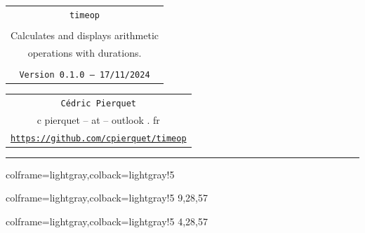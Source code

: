 \documentclass[11pt,a4paper]{ltxdoc}
\def\TPversion{0.1.0}
\def\TPdate{17/11/2024}
\begin{document}
\thispagestyle{empty}

\begin{center}
	\begin{minipage}{0.88\linewidth}
		\begin{tcolorbox}[colframe=yellow,colback=yellow!15]
			\begin{center}
				\renewcommand{\arraystretch}{1.25}%
				\begin{tabular}{c}
					{\Huge \texttt{timeop}}\\
					\\
					{\LARGE Calculates and displays arithmetic} \\
					{\LARGE operations with durations.} \\
					\\
					{\small \texttt{Version \TPversion{} -- \TPdate}}
				\end{tabular}
			\end{center}
		\end{tcolorbox}
	\end{minipage}
\end{center}

\begin{center}
	\begin{tabular}{c}
		\texttt{Cédric Pierquet}\\
		{\ttfamily c pierquet -- at -- outlook . fr}\\
		\texttt{\url{https://github.com/cpierquet/timeop}} \\
	\end{tabular}
\end{center}

\hrule

\vfill

\begin{tcblisting}{colframe=lightgray,colback=lightgray!5}
\end{tcblisting}

\begin{tcblisting}{colframe=lightgray,colback=lightgray!5}
%
  {9,28,57}
\end{tcblisting}

\begin{tcblisting}{colframe=lightgray,colback=lightgray!5}
%
  {4,28,57}
\end{tcblisting}

\vfill~

%
\end{document}
